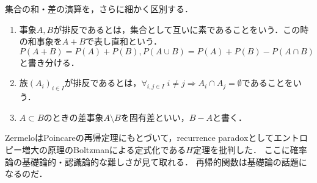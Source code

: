 \documentclass[uplatex,dvipdfmx]{jsreport}
\begin{document}
\begin{notation}
    集合の和・差の演算を，さらに細かく区別する．
    \begin{enumerate}
        \item 事象$A,B$が排反であるとは，集合として互いに素であることをいう．この時の和事象を$A+B$で表し直和という．$P(A+B)=P(A)+P(B),P(A\cup B)=P(A)+P(B)-P(A\cap B)$と書き分ける．
        \item 族$(A_i)_{i\in I}$が排反であるとは，$\forall_{i,j\in I}\;i\ne j\Rightarrow A_i\cap A_j=\emptyset$であることをいう．
        \item $A\subset B$のときの差事象$A\setminus B$を固有差といい，$B-A$と書く．
    \end{enumerate}
\end{notation}
\begin{remarks}
    ZermeloはPoincareの再帰定理にもとづいて，recurrence paradoxとしてエントロピー増大の原理のBoltzmanによる定式化である$H$定理を批判した．
    ここに確率論の基礎論的・認識論的な難しさが見て取れる．
    再帰的関数は基礎論の話題になるのだ．
\end{remarks}
\end{document}
